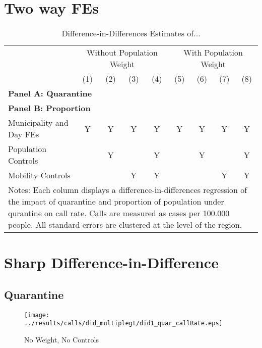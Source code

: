 \documentclass[11pt,letterpaper]{article}
\begin{document}
\section{Two way FEs}

\begin{landscape}
  \begin{table}
    \centering
    \caption{Difference-in-Differences Estimates of...} \label{tab:DD}
    \begin{tabular}{lcccccccc} \toprule
      &\multicolumn{4}{c}{Without Population Weight}&\multicolumn{4}{c}{With Population Weight} \\ 
      \cmidrule(r){2-5}\cmidrule(r){6-9}
      &(1)&(2)&(3)&(4)&(5)&(6)&(7)&(8) \\ \midrule
      \multicolumn{9}{l}{\textbf{Panel A: Quarantine}} \\
       \midrule
      \multicolumn{9}{l}{\textbf{Panel B: Proportion}} \\
      
      \midrule
      Municipality and Day FEs &Y&Y&Y&Y&Y&Y&Y&Y \\
      Population Controls      & &Y& &Y& &Y& &Y \\
      Mobility Controls        & & &Y&Y& & &Y&Y \\
      \bottomrule
      \multicolumn{9}{p{21.8cm}}{{\footnotesize Notes: Each column displays a difference-in-differences regression of the impact of quarantine and proportion of population under qurantine on call rate. Calls are measured as cases per 100.000 people.  All standard errors are clustered at the level of the region.}}
    \end{tabular}
  \end{table}
\end{landscape}

\section{Sharp Difference-in-Difference}
	\subsection{Quarantine}
\begin{figure}[H]
\caption{No Weight, No Controls}
\centering
\texttt{[image: ../results/calls/did\_multiplegt/did1\_quar\_callRate.eps]}
\end{figure}
\end{document}
